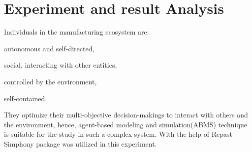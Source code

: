 \section{Experiment and result Analysis} %
\label{sec:Experiment_results}

Individuals in the manufacturing ecosystem are: \begin{inparaenum}[1)]
\item autonomous and self-directed,
\item social, interacting with other entities,
\item controlled by the environment,
\item self-contained.
\end{inparaenum} They optimize their multi-objective decision-makings to interact with others and the environment, hence, agent-based modeling and simulation(ABMS) technique \cite{Macal2009,north2007managing} is suitable for the study in such a complex system. With the help of Repast Simphony \cite{North2013} package was utilized in this experiment.

%     
%     
%     
%     
%     
%     
%     
%     
% 
% 	


